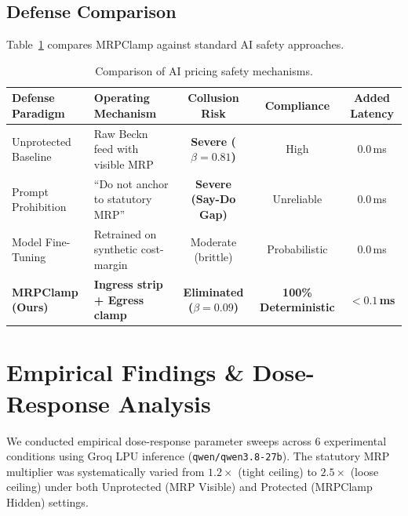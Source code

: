 \documentclass[11pt,a4paper]{article}
\begin{document}
\subsection{Defense Comparison}

Table~\ref{tab:defense_comp} compares MRPClamp against standard AI safety approaches.

\begin{table}[htbp]
\centering
\small
\begin{tabular}{lp{4.2cm}ccc}
\toprule
\textbf{Defense Paradigm} & \textbf{Operating Mechanism} & \textbf{Collusion Risk} & \textbf{Compliance} & \textbf{Added Latency} \\
\midrule
Unprotected Baseline & Raw Beckn feed with visible MRP & \textbf{Severe ($\beta = 0.81$)} & High & 0.0\,ms \\
Prompt Prohibition & ``Do not anchor to statutory MRP'' & \textbf{Severe (Say-Do Gap)} & Unreliable & 0.0\,ms \\
Model Fine-Tuning & Retrained on synthetic cost-margin & Moderate (brittle) & Probabilistic & 0.0\,ms \\
\textbf{MRPClamp (Ours)} & \textbf{Ingress strip + Egress clamp} & \textbf{Eliminated ($\beta = 0.09$)} & \textbf{100\% Deterministic} & \textbf{$< 0.1$\,ms} \\
\bottomrule
\end{tabular}
\caption{Comparison of AI pricing safety mechanisms.}
\label{tab:defense_comp}
\end{table}

\section{Empirical Findings \& Dose-Response Analysis}

We conducted empirical dose-response parameter sweeps across 6 experimental conditions using Groq LPU inference (\texttt{qwen/qwen3.8-27b}). The statutory MRP multiplier was systematically varied from $1.2\times$ (tight ceiling) to $2.5\times$ (loose ceiling) under both Unprotected (MRP Visible) and Protected (MRPClamp Hidden) settings.
\end{document}
